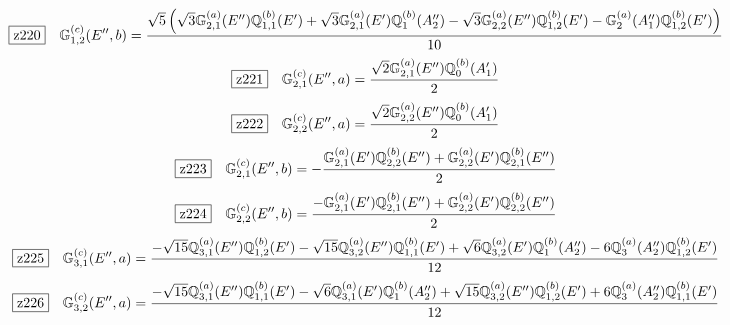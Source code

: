 \documentclass[fleqn,10pt,landscape]{jsarticle}
\begin{document}
\begin{dmath*}
\hspace*{3mm}\fbox{z220}\quad \mathbb{G}_{1,2}^{(c)}(E^{\prime\prime},b)=\frac{\sqrt{5} \left(\sqrt{3} \mathbb{G}_{2,1}^{(a)}(E^{\prime\prime}) \mathbb{Q}_{1,1}^{(b)}(E^{\prime}) + \sqrt{3} \mathbb{G}_{2,1}^{(a)}(E^{\prime}) \mathbb{Q}_{1}^{(b)}(A_{2}^{\prime\prime}) - \sqrt{3} \mathbb{G}_{2,2}^{(a)}(E^{\prime\prime}) \mathbb{Q}_{1,2}^{(b)}(E^{\prime}) - \mathbb{G}_{2}^{(a)}(A_{1}^{\prime\prime}) \mathbb{Q}_{1,2}^{(b)}(E^{\prime})\right)}{10}
\end{dmath*}
\begin{dmath*}
\hspace*{3mm}\fbox{z221}\quad \mathbb{G}_{2,1}^{(c)}(E^{\prime\prime},a)=\frac{\sqrt{2} \mathbb{G}_{2,1}^{(a)}(E^{\prime\prime}) \mathbb{Q}_{0}^{(b)}(A_{1}^{\prime})}{2}
\end{dmath*}
\begin{dmath*}
\hspace*{3mm}\fbox{z222}\quad \mathbb{G}_{2,2}^{(c)}(E^{\prime\prime},a)=\frac{\sqrt{2} \mathbb{G}_{2,2}^{(a)}(E^{\prime\prime}) \mathbb{Q}_{0}^{(b)}(A_{1}^{\prime})}{2}
\end{dmath*}
\begin{dmath*}
\hspace*{3mm}\fbox{z223}\quad \mathbb{G}_{2,1}^{(c)}(E^{\prime\prime},b)=- \frac{\mathbb{G}_{2,1}^{(a)}(E^{\prime}) \mathbb{Q}_{2,2}^{(b)}(E^{\prime\prime}) + \mathbb{G}_{2,2}^{(a)}(E^{\prime}) \mathbb{Q}_{2,1}^{(b)}(E^{\prime\prime})}{2}
\end{dmath*}
\begin{dmath*}
\hspace*{3mm}\fbox{z224}\quad \mathbb{G}_{2,2}^{(c)}(E^{\prime\prime},b)=\frac{- \mathbb{G}_{2,1}^{(a)}(E^{\prime}) \mathbb{Q}_{2,1}^{(b)}(E^{\prime\prime}) + \mathbb{G}_{2,2}^{(a)}(E^{\prime}) \mathbb{Q}_{2,2}^{(b)}(E^{\prime\prime})}{2}
\end{dmath*}
\begin{dmath*}
\hspace*{3mm}\fbox{z225}\quad \mathbb{G}_{3,1}^{(c)}(E^{\prime\prime},a)=\frac{- \sqrt{15} \mathbb{Q}_{3,1}^{(a)}(E^{\prime\prime}) \mathbb{Q}_{1,2}^{(b)}(E^{\prime}) - \sqrt{15} \mathbb{Q}_{3,2}^{(a)}(E^{\prime\prime}) \mathbb{Q}_{1,1}^{(b)}(E^{\prime}) + \sqrt{6} \mathbb{Q}_{3,2}^{(a)}(E^{\prime}) \mathbb{Q}_{1}^{(b)}(A_{2}^{\prime\prime}) - 6 \mathbb{Q}_{3}^{(a)}(A_{2}^{\prime\prime}) \mathbb{Q}_{1,2}^{(b)}(E^{\prime})}{12}
\end{dmath*}
\begin{dmath*}
\hspace*{3mm}\fbox{z226}\quad \mathbb{G}_{3,2}^{(c)}(E^{\prime\prime},a)=\frac{- \sqrt{15} \mathbb{Q}_{3,1}^{(a)}(E^{\prime\prime}) \mathbb{Q}_{1,1}^{(b)}(E^{\prime}) - \sqrt{6} \mathbb{Q}_{3,1}^{(a)}(E^{\prime}) \mathbb{Q}_{1}^{(b)}(A_{2}^{\prime\prime}) + \sqrt{15} \mathbb{Q}_{3,2}^{(a)}(E^{\prime\prime}) \mathbb{Q}_{1,2}^{(b)}(E^{\prime}) + 6 \mathbb{Q}_{3}^{(a)}(A_{2}^{\prime\prime}) \mathbb{Q}_{1,1}^{(b)}(E^{\prime})}{12}
\end{dmath*}
\end{document}

